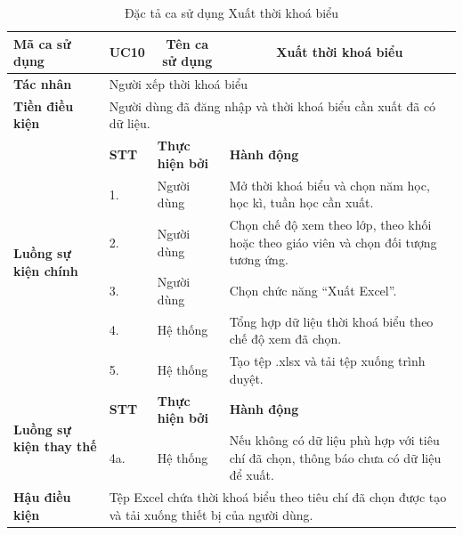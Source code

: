 \documentclass[../DoAn.tex]{subfiles}
\begin{document}
\begin{longtable}{|p{2.8cm}|p{1cm}|p{2.8cm}|p{6.3cm}|}
\caption{Đặc tả ca sử dụng Xuất thời khoá biểu}
\label{tab:app_uc_xuat_tkb} \\
\hline
\multicolumn{1}{|l|}{\textbf{Mã ca sử dụng}} & \multicolumn{1}{c|}{UC10} &
\multicolumn{1}{c|}{\textbf{Tên ca sử dụng}} & \multicolumn{1}{c|}{Xuất thời khoá biểu} \\
\hline
\multicolumn{1}{|l|}{\textbf{Tác nhân}} & \multicolumn{3}{l|}{Người xếp thời khoá biểu} \\
\hline
\multicolumn{1}{|l|}{\textbf{Tiền điều kiện}} & \multicolumn{3}{p{10.5cm}|}{Người dùng đã đăng nhập và thời khoá biểu cần xuất đã có dữ liệu.} \\
\hline
\multirow{6}{2.8cm}{\textbf{Luồng sự kiện chính}} & \textbf{STT} & \textbf{Thực hiện bởi} & \textbf{Hành động} \\
\cline{2-4}
& 1. & Người dùng & Mở thời khoá biểu và chọn năm học, học kì, tuần học cần xuất. \\
\cline{2-4}
& 2. & Người dùng & Chọn chế độ xem theo lớp, theo khối hoặc theo giáo viên và chọn đối tượng tương ứng. \\
\cline{2-4}
& 3. & Người dùng & Chọn chức năng ``Xuất Excel''. \\
\cline{2-4}
& 4. & Hệ thống & Tổng hợp dữ liệu thời khoá biểu theo chế độ xem đã chọn. \\
\cline{2-4}
& 5. & Hệ thống & Tạo tệp .xlsx và tải tệp xuống trình duyệt. \\
\hline
\multirow{2}{2.8cm}{\textbf{Luồng sự kiện thay thế}} & \textbf{STT} & \textbf{Thực hiện bởi} & \textbf{Hành động} \\
\cline{2-4}
& 4a. & Hệ thống & Nếu không có dữ liệu phù hợp với tiêu chí đã chọn, thông báo chưa có dữ liệu để xuất. \\
\hline
\multicolumn{1}{|l|}{\textbf{Hậu điều kiện}} & \multicolumn{3}{p{10.5cm}|}{Tệp Excel chứa thời khoá biểu theo tiêu chí đã chọn được tạo và tải xuống thiết bị của người dùng.} \\
\hline
\end{longtable}
\end{document}
